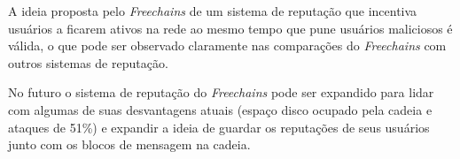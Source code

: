 \documentclass[12pt]{article}
\newcommand{\FC} {\emph{Freechains}\xspace}
\begin{document}
A ideia proposta pelo \FC de um sistema de reputação que incentiva usuários a ficarem ativos na rede ao mesmo tempo que pune usuários maliciosos é válida, o que pode ser observado claramente nas comparações do \FC com outros sistemas de reputação. 

No futuro o sistema de reputação do \FC pode ser expandido para lidar com algumas de suas desvantagens atuais (espaço disco ocupado pela cadeia e ataques de 51\%) e expandir a ideia de guardar os reputações de seus usuários junto com os blocos de mensagem na cadeia.



\end{document}
